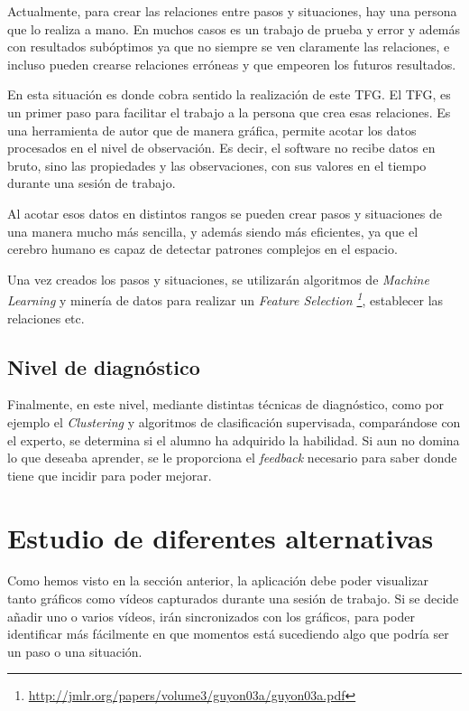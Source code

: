 Actualmente, para crear las relaciones entre pasos y situaciones, hay una persona que lo realiza a mano. En muchos casos
es un trabajo de prueba y error y adem\'as con resultados sub\'optimos ya que no siempre se ven claramente las relaciones,
e incluso pueden crearse relaciones err\'oneas y que empeoren los futuros resultados.

En esta situaci\'on es donde cobra sentido la realizaci\'on de este TFG. El TFG, es un primer paso para facilitar
el trabajo a la persona que crea esas relaciones. Es una herramienta de autor que de manera gr\'afica, permite
acotar los datos procesados en el nivel de observaci\'on. Es decir, el software no recibe datos en bruto, sino
las propiedades y las observaciones, con sus valores en el tiempo durante una sesi\'on de trabajo.

Al acotar esos datos en distintos rangos se pueden crear pasos y situaciones de una manera mucho m\'as sencilla, y adem\'as
siendo m\'as eficientes, ya que el cerebro humano es capaz de detectar patrones complejos en el espacio.

Una vez creados los pasos y situaciones, se utilizar\'an algoritmos de \emph{Machine Learning} y miner\'ia de datos para
realizar un \emph{Feature Selection \footnote{\url{http://jmlr.org/papers/volume3/guyon03a/guyon03a.pdf}}},
establecer las relaciones etc.

\subsection{Nivel de diagn\'ostico}
Finalmente, en este nivel, mediante distintas t\'ecnicas de diagn\'ostico, como por ejemplo el \emph{Clustering} y
algoritmos de clasificaci\'on supervisada, compar\'andose con el experto,
se determina si el alumno ha adquirido la habilidad. Si aun no domina lo que deseaba aprender, se le proporciona el \emph{feedback} 
necesario para saber donde tiene que incidir para poder mejorar.

\section{Estudio de diferentes alternativas}
Como hemos visto en la secci\'on anterior, la aplicaci\'on debe poder visualizar tanto gr\'aficos como 
v\'ideos capturados durante una sesi\'on de trabajo. Si se decide a\~nadir uno o varios v\'ideos, ir\'an
sincronizados con los gr\'aficos, para poder identificar m\'as f\'acilmente en que momentos est\'a sucediendo
algo que podr\'ia ser un paso o una situaci\'on.

